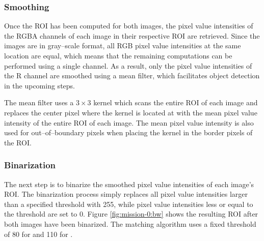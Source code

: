 \subsubsection{Smoothing} \label{subsubsect:case-study:impl:smooth}
Once the ROI has been computed for both images, the pixel value intensities of the RGBA channels of each image in their respective ROI are retrieved. Since the images are in gray--scale format, all RGB pixel value intensities at the same location are equal, which means that the remaining computations can be performed using a single channel. As a result, only the pixel value intensities of the R channel are smoothed using a mean filter, which facilitates object detection in the upcoming steps. \newline

The mean filter uses a $3 \times 3$ kernel which scans the entire ROI of each image and replaces the center pixel where the kernel is located at with the mean pixel value intensity of the entire ROI of each image. The mean pixel value intensity is also used for out--of--boundary pixels when placing the kernel in the border pixels of the ROI.

\subsubsection{Binarization} \label{subsubsect:case-study:impl:binarization}
The next step is to binarize the smoothed pixel value intensities of each image's ROI. The binarization process simply replaces all pixel value intensities larger than a specified threshold with 255, while pixel value intensities less or equal to the threshold are set to 0. Figure \ref{fig:mission-0:bw} shows the resulting ROI after both images have been binarized. The matching algorithm uses a fixed threshold of 80 for \usno and 110 for \panstarrs.

